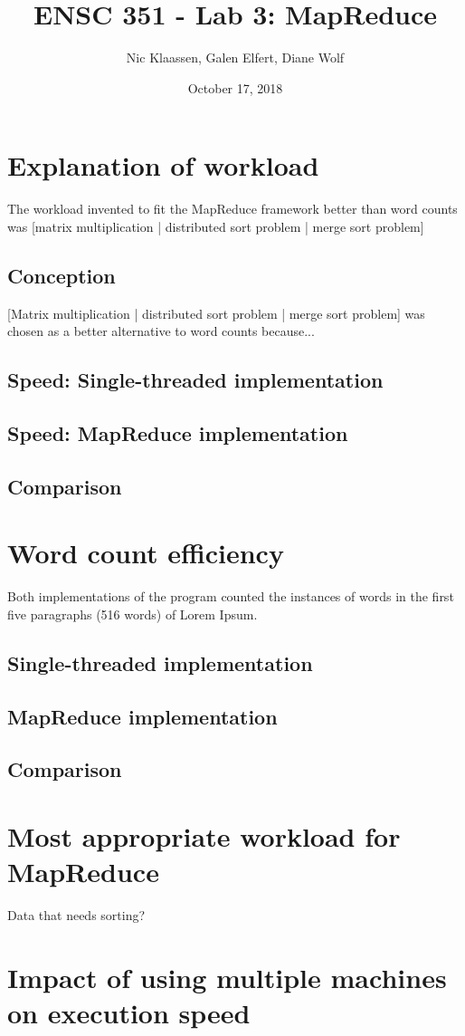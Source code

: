 \documentclass[12pt, letterpaper]{article}
\begin{document}
\title{ENSC 351 - Lab 3: MapReduce}
\date{October 17, 2018}
\author{Nic Klaassen, Galen Elfert, Diane Wolf}
\maketitle
\section{Explanation of workload}
	The workload invented to fit the MapReduce framework better than word counts was {[matrix multiplication | distributed sort problem | merge sort problem]}
\subsection{Conception}
	{[Matrix multiplication | distributed sort problem | merge sort problem]} was chosen as a better alternative to word counts because...
\subsection{Speed: Single-threaded implementation}
\subsection{Speed: MapReduce implementation}
\subsection{Comparison}
\section{Word count efficiency}
	Both implementations of the program counted the instances of words in the first five paragraphs (516 words) of Lorem Ipsum.
\subsection{Single-threaded implementation}
\subsection{MapReduce implementation}
\subsection{Comparison}

\section{Most appropriate workload for MapReduce}
Data that needs sorting?
\section{Impact of using multiple machines on execution speed}
\end{document}

